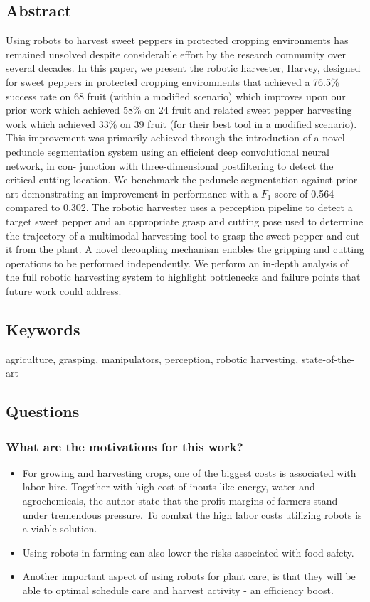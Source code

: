 \documentclass{article}
\begin{document}
\subsection*{Abstract}
Using robots to harvest sweet peppers in protected cropping environments has
remained unsolved despite considerable effort by the research community over
several decades. In this paper, we present the robotic harvester, Harvey, designed
for sweet peppers in protected cropping environments that achieved a 76.5\%
success rate on 68 fruit (within a modified scenario) which improves upon our prior
work which achieved 58\% on 24 fruit and related sweet pepper harvesting work
which achieved 33\% on 39 fruit (for their best tool in a modified scenario). This
improvement was primarily achieved through the introduction of a novel peduncle
segmentation system using an efficient deep convolutional neural network, in con-
junction with three‐dimensional postfiltering to detect the critical cutting location.
We benchmark the peduncle segmentation against prior art demonstrating
an improvement in performance with a $F_1$ score of 0.564 compared to 0.302. The
robotic harvester uses a perception pipeline to detect a target sweet pepper and an
appropriate grasp and cutting pose used to determine the trajectory of a multimodal
harvesting tool to grasp the sweet pepper and cut it from the plant. A novel
decoupling mechanism enables the gripping and cutting operations to be performed
independently. We perform an in‐depth analysis of the full robotic harvesting system
to highlight bottlenecks and failure points that future work could address.

\subsection*{Keywords}
agriculture, grasping, manipulators, perception, robotic harvesting, state-of-the-art


\subsection*{Questions}
\subsubsection*{What are the motivations for this work?}
\begin{itemize}
    \item For growing and harvesting crops, one of the biggest costs is associated with labor hire. Together with high cost of inouts like energy, water and agrochemicals, the author state that the profit margins of farmers stand under tremendous pressure. To combat the high labor costs utilizing robots is a viable solution.
    \item Using robots in farming can also lower the risks associated with food safety.
    \item Another important aspect of using robots for plant care, is that they will be able to optimal schedule care and harvest activity - an efficiency boost.
\end{itemize}
\end{document}
